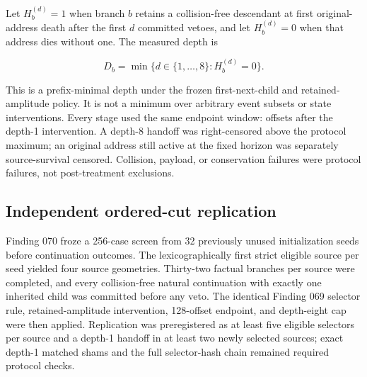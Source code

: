 Let $H_b^{(d)}=1$ when branch $b$ retains a collision-free descendant at first
original-address death after the first $d$ committed vetoes, and let
$H_b^{(d)}=0$ when that address dies without one. The measured depth is

\begin{equation}
D_b=\min\{d\in\{1,\ldots,8\}:H_b^{(d)}=0\}.
\end{equation}

This is a prefix-minimal depth under the frozen first-next-child and
retained-amplitude policy. It is not a minimum over arbitrary event subsets or
state interventions. Every stage used the same endpoint window:
\GCTenFixedHorizon{} offsets after the depth-1 intervention. A depth-8 handoff
was right-censored above the protocol maximum; an original address still active
at the fixed horizon was separately source-survival censored. Collision,
payload, or conservation failures were protocol failures, not post-treatment
exclusions.

\subsection{Independent ordered-cut replication}

Finding 070 froze a 256-case screen from 32 previously unused initialization
seeds before continuation outcomes. The lexicographically first strict eligible
source per seed yielded four source geometries. Thirty-two factual branches per
source were completed, and every collision-free natural continuation with
exactly one inherited child was committed before any veto. The identical
Finding 069 selector rule, retained-amplitude intervention, 128-offset endpoint,
and depth-eight cap were then applied. Replication was preregistered as at least
five eligible selectors per source and a depth-1 handoff in at least two newly
selected sources; exact depth-1 matched shams and the full selector-hash chain
remained required protocol checks.
